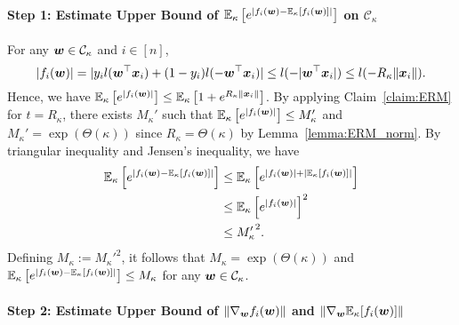 \paragraph{Step 1: Estimate Upper Bound of $\mathbb{E}_\kappa \left[ e^{\left|f_i({\bm{w}}) - \mathbb{E}_\kappa[f_i({\bm{w}})]\right|}\right]$ on $\mathcal{C}_\kappa$}\quad

For any ${\bm{w}} \in \mathcal{C}_\kappa$ and $i \in [n]$,
\begin{equation*}
    |f_i({\bm{w}})| = |y_il({\bm{w}}^\top {\bm{x}}_i) + (1-y_i)l(-{\bm{w}}^\top {\bm{x}}_i)| \leq l(-|{\bm{w}}^\top {\bm{x}}_i|) \leq l(-R_\kappa \lVert {\bm{x}}_i \rVert).
\end{equation*}
Hence, we have $\mathbb{E}_\kappa \left[ e^{|f_i({\bm{w}})|}\right] \leq  \mathbb{E}_\kappa \left[ 1+ e^{R_\kappa\lVert {\bm{x}}_i \rVert} \right]$. By applying Claim~\ref{claim:ERM} for $t= R_\kappa$, there exists $M_\kappa'$ such that  $\mathbb{E}_\kappa \left[ e^{|f_i({\bm{w}})|}\right] \leq  M_\kappa'$ and $M_\kappa' = \exp(\Theta(\kappa))$ since $R_\kappa = \Theta(\kappa)$ by Lemma~\ref{lemma:ERM_norm}.
By triangular inequality and Jensen's inequality, we have
\begin{align*}
\mathbb{E}_\kappa \left[ e^{\left|f_i({\bm{w}}) - \mathbb{E}_\kappa \left[f_i({\bm{w}})\right]\right|}\right] 
&\leq \mathbb{E}_\kappa \left[ e^{\left|f_i({\bm{w}})\right| + \left|\mathbb{E}_\kappa \left [f_i({\bm{w}})\right]\right|}\right]\\
&\leq \mathbb{E}_\kappa \left[ e^{\left|f_i({\bm{w}})\right| }\right]^2\\
&\leq {M_\kappa'}^2.
\end{align*}
Defining $M_\kappa := {M_\kappa'}^2$, it follows that $M_\kappa = \exp(\Theta(\kappa))$ and $\mathbb{E}_\kappa \left[ e^{\left|f_i({\bm{w}}) - \mathbb{E}_\kappa[f_i({\bm{w}})]\right| }\right] \leq M_\kappa$ for any ${\bm{w}} \in \mathcal{C}_\kappa$.

\paragraph{Step 2: Estimate Upper Bound of $\lVert \nabla_{\bm{w}} f_i({\bm{w}}) \rVert$ and $\lVert \nabla_{\bm{w}} \mathbb{E}_\kappa[ f_i({\bm{w}}) ]\rVert$} \quad

